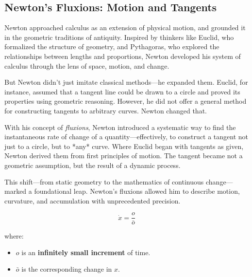 \subsection{Newton’s Fluxions: Motion and Tangents}  

Newton approached calculus as an extension of physical motion, and grounded it in the geometric traditions of antiquity. Inspired by thinkers like Euclid, who formalized the structure of geometry, and Pythagoras, who explored the relationships between lengths and proportions, Newton developed his system of calculus through the lens of space, motion, and change.

But Newton didn’t just imitate classical methods—he expanded them. Euclid, for instance, assumed that a tangent line could be drawn to a circle and proved its properties using geometric reasoning. However, he did not offer a general method for constructing tangents to arbitrary curves. Newton changed that.

With his concept of \textit{fluxions}, Newton introduced a systematic way to find the instantaneous rate of change of a quantity—effectively, to construct a tangent not just to a circle, but to *any* curve. Where Euclid began with tangents as given, Newton derived them from first principles of motion. The tangent became not a geometric assumption, but the result of a dynamic process.

This shift—from static geometry to the mathematics of continuous change—marked a foundational leap. Newton’s fluxions allowed him to describe motion, curvature, and accumulation with unprecedented precision.

\[
\dot{x} = \frac{o}{\bar{o}}
\]

where:  
\begin{itemize}
    \item \( o \) is an \textbf{infinitely small increment} of time.  
    \item \( \bar{o} \) is the corresponding change in \( x \).  
\end{itemize}  

